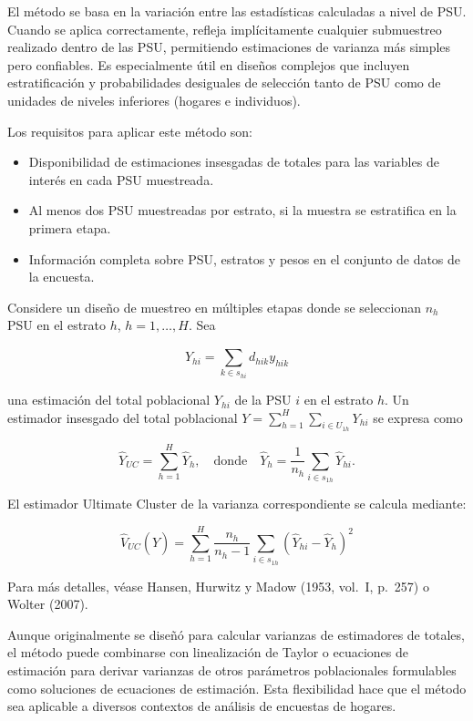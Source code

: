 \documentclass[
  spanish,
  12pt,
]{book}
\providecommand{\tightlist}{%
  \setlength{\itemsep}{0pt}\setlength{\parskip}{0pt}}
\begin{document}
El método se basa en la variación entre las estadísticas calculadas a nivel de PSU. Cuando se aplica correctamente, refleja implícitamente cualquier submuestreo realizado dentro de las PSU, permitiendo estimaciones de varianza más simples pero confiables. Es especialmente útil en diseños complejos que incluyen estratificación y probabilidades desiguales de selección tanto de PSU como de unidades de niveles inferiores (hogares e individuos).

Los requisitos para aplicar este método son:

\begin{itemize}
\tightlist
\item
  Disponibilidad de estimaciones insesgadas de totales para las variables de interés en cada PSU muestreada.
\item
  Al menos dos PSU muestreadas por estrato, si la muestra se estratifica en la primera etapa.
\item
  Información completa sobre PSU, estratos y pesos en el conjunto de datos de la encuesta.
\end{itemize}

Considere un diseño de muestreo en múltiples etapas donde se seleccionan \(n_h\) PSU en el estrato \(h\), \(h=1,\dots,H\). Sea

\[
\hat{Y}_{hi} = \sum_{k\in s_{hi}} d_{hik} y_{hik}
\]

una estimación del total poblacional \(Y_{hi}\) de la PSU \(i\) en el estrato \(h\). Un estimador insesgado del total poblacional \(Y = \sum_{h=1}^H \sum_{i \in U_{1h}} Y_{hi}\) se expresa como

\[
\hat{Y}_{UC} = \sum_{h=1}^H \hat{Y}_h, \quad \text{donde} \quad \hat{Y}_h = \frac{1}{n_h} \sum_{i\in s_{1h}} \hat{Y}_{hi}.
\]

El estimador Ultimate Cluster de la varianza correspondiente se calcula mediante:

\[
\hat{V}_{UC}(\hat{Y}) = \sum_{h=1}^H \frac{n_h}{n_h-1} \sum_{i \in s_{1h}} (\hat{Y}_{hi} - \hat{Y}_h)^2
\]

Para más detalles, véase Hansen, Hurwitz y Madow (1953, vol.~I, p.~257) o Wolter (2007).

Aunque originalmente se diseñó para calcular varianzas de estimadores de totales, el método puede combinarse con linealización de Taylor o ecuaciones de estimación para derivar varianzas de otros parámetros poblacionales formulables como soluciones de ecuaciones de estimación. Esta flexibilidad hace que el método sea aplicable a diversos contextos de análisis de encuestas de hogares.
\end{document}
